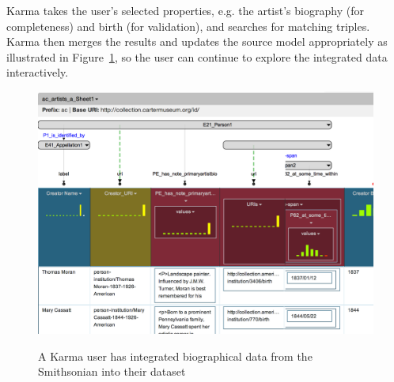 Karma takes the user's selected properties, e.g. the artist's biography (for completeness) and birth (for validation), and searches for matching triples.
Karma then merges the results and updates the source model appropriately as illustrated in Figure~\ref{fig:augment-screenshot}, so the user can continue to explore the integrated data interactively. 

\begin{figure}
\begin{center}
\includegraphics[width=4.9in]{images/6-augment.png}
\vspace{-3mm}
\caption{A Karma user has integrated biographical data from the Smithsonian into their dataset}
\vspace{-2mm}
\label{fig:augment-screenshot}
\end{center}
\vspace{-1.5em}
\end{figure}
